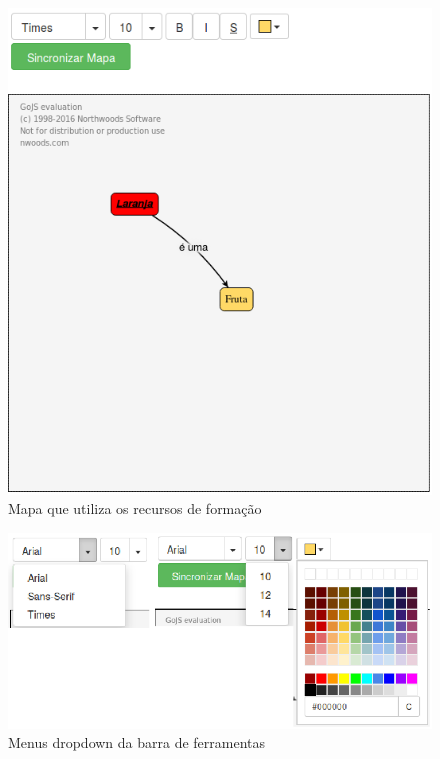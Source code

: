 \documentclass[
	12pt,				%
	openright,			%
	oneside,			%
	a4paper,			%
	english,			%
	french,				%
	spanish,			%
	brazil				%
	]{abntex2}
\begin{document}
\begin{figure}[htb]
	\caption{\label{fig_mapa} Mapa que utiliza os recursos de formação}
	\begin{center}
		\includegraphics[scale=0.3]{mapa.png}
	\end{center}
\end{figure}

\begin{figure}[htb]
	\caption{\label{fig_toolbar} Menus dropdown da barra de ferramentas}
	\begin{center}
		\includegraphics[scale=0.3]{toolbar.png}
	\end{center}
\end{figure}
\end{document}
